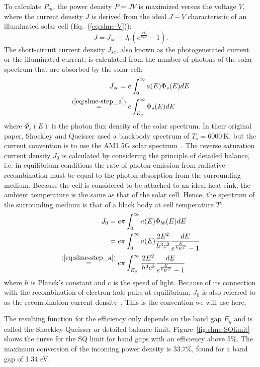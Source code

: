 \begin{refsection}
To calculate $P_m$, the power density $P = JV$ is maximized versus the voltage 
$V$, where the current density $J$ is derived from the ideal $J-V$ 
characteristic of an illuminated solar cell (Eq.~(\ref{eq:slme-V})): 
\begin{equation}\label{eq:slme-JV} 
J = J_{sc} - J_0 \left(e^{\frac{eV}{k_B T}} - 1\right). 
\end{equation} 
The short-circuit current density $J_{sc}$, also known as the photogenerated 
current or the illuminated current, is calculated from the number of photons 
of the solar spectrum that are absorbed by the solar cell: 
\begin{align} 
J_{sc} = e &\int_0^{\infty} a(E) \Phi_s (E) dE \\ 
\stackrel{(\ref{eq:slme-step_a})}{=} e &\int_{E_g}^{\infty} \Phi_s (E) dE 
\label{eq:slme-Ish} 
\end{align} 
where $\Phi_s(E)$ is the photon flux density of the solar spectrum. In their 
original paper, Shockley and Queisser used a blackbody spectrum of $T_s = 
6000~\si{\kelvin}$, but the current convention is to use the AM1.5G solar 
spectrum~\cite{International2012}.  The reverse saturation current density 
$J_0$ is calculated by considering the principle of detailed balance, i.e. in 
equilibrium conditions the rate of photon emission from radiative 
recombination must be equal to the photon absorption from the surrounding 
medium. Because the cell is considered to be attached to an ideal heat sink, 
the ambient temperature is the same as that of the solar cell. Hence, the 
spectrum of the surrounding medium is that of a black body at cell temperature 
$T$: 
\begin{align} 
J_0 = e \pi &\int_0^{\infty} a(E) \Phi_{bb}(E) dE\nonumber \\ 
= e \pi &\int_0^{\infty} a(E) \frac{2E^2}{h^3 c^2} \frac{dE}{e^{\frac{E}{k_B 
T}}-1} \\ 
\stackrel{(\ref{eq:slme-step_a})}{=} e \pi &\int_{E_g}^{\infty} 
\frac{2E^2}{h^3 c^2} \frac{dE}{e^{\frac{E}{k_B T}}-1} \label{eq:slme-I0} 
\end{align} 
where $h$ is Planck's constant and $c$ is the speed of light. Because of its 
connection with the recombination of electron-hole pairs at equilibrium, $J_0$ 
is also referred to as the recombination current density~\cite{Cuevas2014}. 
This is the convention we will use here. 
 
The resulting function for the efficiency only depends on the band gap $E_g$ 
and is called the Shockley-Queisser or detailed balance limit. 
Figure~\ref{fig:slme-SQlimit} shows the curve for the SQ limit for band gaps 
with an efficiency above 5\%. The maximum conversion of the incoming power 
density is 33.7\%, found for a band gap of 1.34 eV. 
 

\end{refsection}
